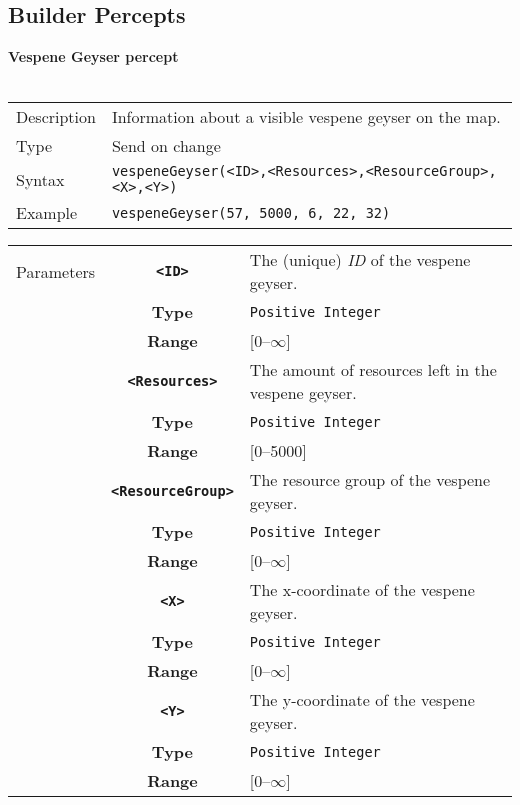 \subsection{Builder Percepts}
\textbf{Vespene Geyser percept}\\
\\
\begin{tabularx}{\textwidth}{lX}
 Description & Information about a visible vespene geyser on the map. \\
 Type & Send on change \\
 Syntax & \verb|vespeneGeyser(<ID>,<Resources>,<ResourceGroup>,<X>,<Y>)| \\
 Example & \verb|vespeneGeyser(57, 5000, 6, 22, 32)| \\ 
 \end{tabularx}
 \begin{tabularx}{\textwidth}{l | c | p{8cm}|}
 \cline{2-3} 
 Parameters & \textbf{\verb|<ID>|} & The (unique) \textit{ID} of the vespene geyser.\\
            & \textbf{Type} & \verb|Positive Integer| \\
            & \textbf{Range} & [0--$\infty$] \\
            \cline{2-3} 
            & \textbf{\verb|<Resources>|} & The amount of resources left in the vespene geyser.\\
            & \textbf{Type} & \verb|Positive Integer| \\
            & \textbf{Range} & [0--5000] \\
            \cline{2-3} 
            & \textbf{\verb|<ResourceGroup>|} & The resource group of the vespene geyser. \\
            & \textbf{Type} & \verb|Positive Integer| \\
            & \textbf{Range} & [0--$\infty$] \\
            \cline{2-3} 
            & \textbf{\verb|<X>|} & The x-coordinate of the vespene geyser.\\
            & \textbf{Type} & \verb|Positive Integer| \\
            & \textbf{Range} & [0--$\infty$] \\
            \cline{2-3} 
            & \textbf{\verb|<Y>|} & The y-coordinate of the vespene geyser.\\
            & \textbf{Type} & \verb|Positive Integer| \\
            & \textbf{Range} & [0--$\infty$] \\
            \cline{2-3} 
\end{tabularx} \\
